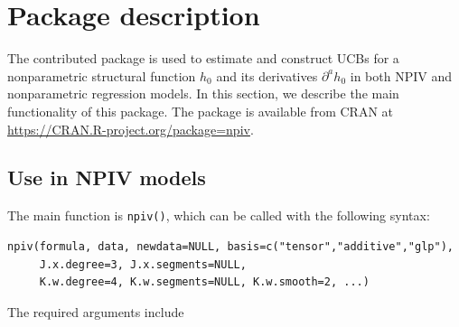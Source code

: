 \documentclass[
]{jss}
\begin{document}
\section{Package description}\label{desc}

The contributed  package  is used to estimate and
construct UCBs for a nonparametric structural function \(h_0\) and its
derivatives \(\partial^a h_0\) in both NPIV and nonparametric regression
models. In this section, we describe the main functionality of this
package. The package  is available from CRAN at
\url{https://CRAN.R-project.org/package=npiv}.

\subsection{Use in NPIV models}\label{use-in-npiv-models}

The main function is \texttt{npiv()}, which can be called with the
following syntax:

\begin{verbatim}
npiv(formula, data, newdata=NULL, basis=c("tensor","additive","glp"),
     J.x.degree=3, J.x.segments=NULL, 
     K.w.degree=4, K.w.segments=NULL, K.w.smooth=2, ...)
\end{verbatim}

The required arguments include
\end{document}
